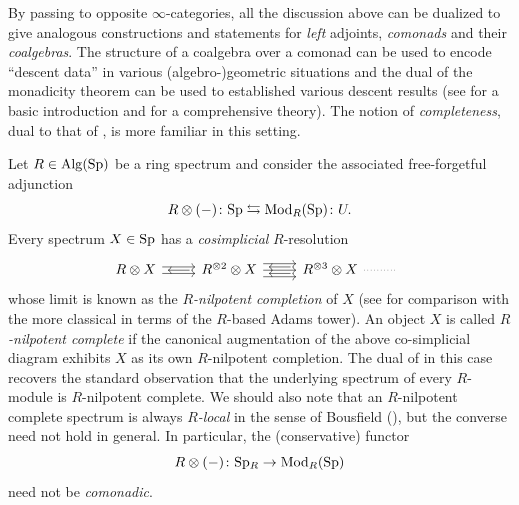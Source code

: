 \documentclass[12pt]{article}
\begin{document}
By passing to opposite $\infty$-categories, all the discussion above can be dualized to give analogous constructions and statements for \textit{left} adjoints, \textit{comonads} and their \textit{coalgebras}. The structure of a coalgebra over a comonad can be used to encode ``descent data'' in various (algebro-)geometric situations and the dual of the monadicity theorem can be used to established various descent results (see \cite[Section 4.7]{borceux1994handbook} for a basic introduction and \cite[Appendix D]{SAG} for a comprehensive theory).  
The notion of \textit{completeness}, dual to that of , is more familiar in this setting.
\begin{example}\label{Nil_Completion}
     Let $R\in\operatorname{Alg}(\mathrm{Sp})$ be a ring spectrum and consider the associated free-forgetful adjunction
    \[
        R\otimes(-)\colon \mathrm{Sp} \leftrightarrows \operatorname{\operatorname{Mod}}_R(\mathrm{Sp})\colon U.
    \]
    Every spectrum $X\in\mathrm{Sp}$ has a \textit{cosimplicial} $R$-resolution
    \[
        \begin{tikzcd}
        	{R\otimes X} & {R^{\otimes 2}\otimes X} & { R^{\otimes3}\otimes X} & {{}}
        	\arrow[shift left=1, from=1-1, to=1-2]
        	\arrow[shift right=1, from=1-1, to=1-2]
        	\arrow[shorten <=4pt, shorten >=4pt, from=1-2, to=1-1]
        	\arrow[shift left=2, from=1-2, to=1-3]
        	\arrow[from=1-2, to=1-3]
        	\arrow[shift right=2, from=1-2, to=1-3]
        	\arrow[shift left=1, shorten <=4pt, shorten >=4pt, from=1-3, to=1-2]
        	\arrow[shift right=1, shorten <=4pt, shorten >=4pt, from=1-3, to=1-2]
        	\arrow[dotted, no head, from=1-3, to=1-4]
        \end{tikzcd}
    \]
    whose limit is known as the \textit{$R$-nilpotent completion} of $X$ (see \cite[Proposition 2.14]{mathew2017nilpotence} for comparison with the more classical \cite[Definition 1.3]{ravenel1984localization} in terms of the $R$-based Adams tower). An object $X$ is called \textit{$R$-nilpotent complete} if the canonical augmentation of the above co-simplicial diagram exhibits $X$ as its own $R$-nilpotent completion. The dual of  in this case recovers the standard observation that the underlying spectrum of every $R$-module is $R$-nilpotent complete. We should also note that an $R$-nilpotent complete spectrum is always \textit{$R$-local} in the sense of Bousfield (), but the converse need not hold in general. In particular, the (conservative) functor
    \[
        R\otimes(-)\colon \mathrm{Sp}{}_R \to \operatorname{\operatorname{Mod}}_R(\mathrm{Sp})
    \]
    need not be \textit{comonadic}. 
\end{example}
\end{document}
